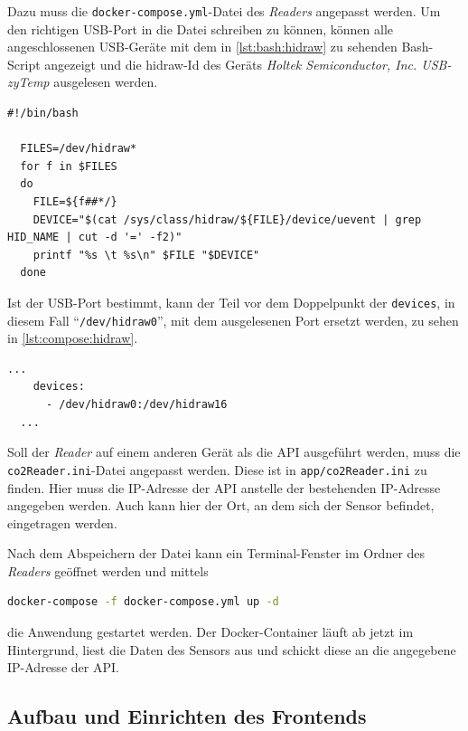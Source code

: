 \documentclass[a4paper,
    11pt,
    headings=small,
    ngerman,
    listof=totoc,
    numbers=noenddot]{scrreprt}[2021/11/13]
\begin{document}
Dazu muss die \texttt{docker-compose.yml}-Datei des \textit{Readers} angepasst werden. Um den richtigen USB-Port in die Datei schreiben zu können, können alle angeschlossenen USB-Geräte mit dem in \cref{lst:bash:hidraw} zu sehenden Bash-Script angezeigt und die \gls{hidraw}-Id des Geräts \textit{Holtek Semiconductor, Inc. USB-zyTemp} ausgelesen werden. \autocite{get_usb_hidraw}

\begin{lstlisting}[language=docker-compose-2,caption={Bash-Script zum Erkennen der \gls{hidraw}-Id},breaklines=true,label={lst:bash:hidraw}]
  #!/bin/bash

  FILES=/dev/hidraw*
  for f in $FILES
  do
    FILE=${f##*/}
    DEVICE="$(cat /sys/class/hidraw/${FILE}/device/uevent | grep HID_NAME | cut -d '=' -f2)"
    printf "%s \t %s\n" $FILE "$DEVICE"
  done
\end{lstlisting}

Ist der USB-Port bestimmt, kann der Teil vor dem Doppelpunkt der \texttt{devices}, in diesem Fall \enquote{\texttt{/dev/hidraw0}}, mit dem ausgelesenen Port ersetzt werden, zu sehen in \vref{lst:compose:hidraw}.

\begin{lstlisting}[language=docker-compose-2,caption={Anpassen des USB-Ports in der docker-compose.yml},breaklines=true,label={lst:compose:hidraw}]
  ...
    devices:
      - /dev/hidraw0:/dev/hidraw16
  ...
\end{lstlisting}

Soll der \textit{Reader} auf einem anderen Gerät als die \ac{API} ausgeführt werden, muss die \texttt{co2Reader.ini}-Datei angepasst werden. Diese ist in \texttt{app/co2Reader.ini} zu finden. Hier muss die IP-Adresse der \ac{API} anstelle der bestehenden IP-Adresse angegeben werden. Auch kann hier der Ort, an dem sich der Sensor befindet, eingetragen werden.

Nach dem Abspeichern der Datei kann ein Terminal-Fenster im Ordner des \textit{Readers} geöffnet werden und mittels

\begin{lstlisting}[language=Bash]
  docker-compose -f docker-compose.yml up -d
\end{lstlisting}

die Anwendung gestartet werden. Der \gls{Docker}-Container läuft ab jetzt im Hintergrund, liest die Daten des Sensors aus und schickt diese an die angegebene IP-Adresse der \ac{API}.

\subsection{Aufbau und Einrichten des Frontends}
\end{document}
